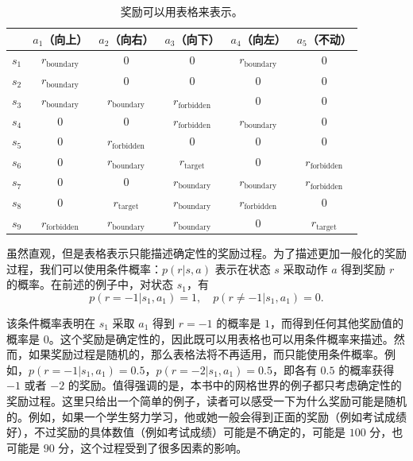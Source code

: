 \begin{table}[H]
\centering
\caption{奖励可以用表格来表示。}
\label{tab:rl-basic-reward}
\begin{tabular}{cccccc}
\toprule
 & $a_1$（向上） & $a_2$（向右） & $a_3$（向下） & $a_4$（向左） & $a_5$（不动） \\
\midrule
$s_1$ & $r_{\mathrm{boundary}}$ & $0$ & $0$ & $r_{\mathrm{boundary}}$ & $0$ \\
$s_2$ & $r_{\mathrm{boundary}}$ & $0$ & $0$ & $0$ & $0$ \\
$s_3$ & $r_{\mathrm{boundary}}$ & $r_{\mathrm{boundary}}$ & $r_{\mathrm{forbidden}}$ & $0$ & $0$ \\
$s_4$ & $0$ & $0$ & $r_{\mathrm{forbidden}}$ & $r_{\mathrm{boundary}}$ & $0$ \\
$s_5$ & $0$ & $r_{\mathrm{forbidden}}$ & $0$ & $0$ & $0$ \\
$s_6$ & $0$ & $r_{\mathrm{boundary}}$ & $r_{\mathrm{target}}$ & $0$ & $r_{\mathrm{forbidden}}$ \\
$s_7$ & $0$ & $0$ & $r_{\mathrm{boundary}}$ & $r_{\mathrm{boundary}}$ & $r_{\mathrm{forbidden}}$ \\
$s_8$ & $0$ & $r_{\mathrm{target}}$ & $r_{\mathrm{boundary}}$ & $r_{\mathrm{forbidden}}$ & $0$ \\
$s_9$ & $r_{\mathrm{forbidden}}$ & $r_{\mathrm{boundary}}$ & $r_{\mathrm{boundary}}$ & $0$ & $r_{\mathrm{target}}$ \\
\bottomrule
\end{tabular}
\end{table}

虽然直观，但是表格表示只能描述确定性的奖励过程。为了描述更加一般化的奖励过程，我们可以使用条件概率：$p(r|s,a)$ 表示在状态 $s$ 采取动作 $a$ 得到奖励 $r$ 的概率。在前述的例子中，对状态 $s_1$，有
\begin{equation}
  p(r = -1 | s_1, a_1) = 1, \quad p(r \neq -1 | s_1, a_1) = 0.
\end{equation}

该条件概率表明在 $s_1$ 采取 $a_1$ 得到 $r = -1$ 的概率是 $1$，而得到任何其他奖励值的概率是 $0$。这个奖励是确定性的，因此既可以用表格也可以用条件概率来描述。然而，如果奖励过程是随机的，那么表格法将不再适用，而只能使用条件概率。例如，$p(r = -1|s_1, a_1) = 0.5$，$p(r = -2|s_1, a_1) = 0.5$，即各有 $0.5$ 的概率获得 $-1$ 或者 $-2$ 的奖励。值得强调的是，本书中的网格世界的例子都只考虑确定性的奖励过程。这里只给出一个简单的例子，读者可以感受一下为什么奖励可能是随机的。例如，如果一个学生努力学习，他或她一般会得到正面的奖励（例如考试成绩好），不过奖励的具体数值（例如考试成绩）可能是不确定的，可能是 $100$ 分，也可能是 $90$ 分，这个过程受到了很多因素的影响。

